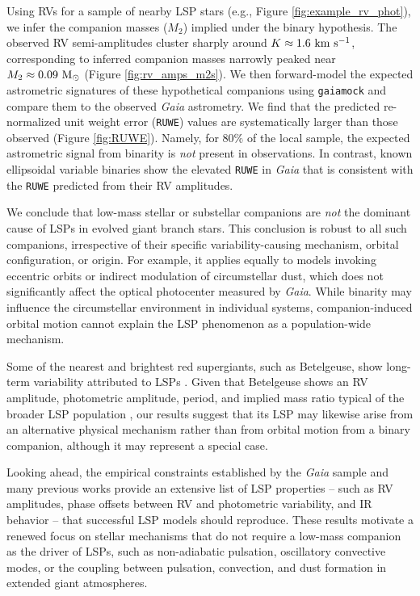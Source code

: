 \documentclass[trackchanges,twocolumn]{aastex631}
\begin{document}
Using RVs for a sample of nearby LSP stars (e.g., Figure \ref{fig:example_rv_phot}), we infer the companion masses ($M_2$) implied under the binary hypothesis. The observed RV semi-amplitudes cluster sharply around $K\approx1.6~{\rm km~s^{-1}}$, corresponding to inferred companion masses narrowly peaked near $M_2\approx0.09~{\rm M_\odot}$ (Figure \ref{fig:rv_amps_m2s}). We then forward-model the expected astrometric signatures of these hypothetical companions using {\tt gaiamock} \citep{ElBadry24} and compare them to the observed {\it Gaia} astrometry. We find that the predicted re-normalized unit weight error ({\tt RUWE}) values are systematically larger than those observed (Figure \ref{fig:RUWE}). Namely, for $80\%$ of the local sample, the expected astrometric signal from binarity is {\it not} present in observations. In contrast, known ellipsoidal variable binaries show the elevated {\tt RUWE} in {\it Gaia} that is consistent with the {\tt RUWE} predicted from their RV amplitudes. 

We conclude that low-mass stellar or substellar companions are {\it not} the dominant cause of LSPs in evolved giant branch stars. This conclusion is robust to all such companions, irrespective of their specific variability-causing mechanism, orbital configuration, or origin. For example, it applies equally to models invoking eccentric orbits or indirect modulation of circumstellar dust, which does not significantly affect the optical photocenter measured by {\it Gaia}. While binarity may influence the circumstellar environment in individual systems, companion-induced orbital motion cannot explain the LSP phenomenon as a population-wide mechanism.

Some of the nearest and brightest red supergiants, such as Betelgeuse, show long-term variability attributed to LSPs \citep[e.g.,][]{Kiss06,Joyce20,Goldberg24, MacLeod25}.
Given that Betelgeuse shows an RV amplitude, photometric amplitude, period, and implied mass ratio typical of the broader LSP population \citep[e.g.,][]{Goldberg24,MacLeod25}, our results suggest that its LSP may likewise arise from an alternative physical mechanism rather than from orbital motion from a binary companion, although it may represent a special case.

Looking ahead, the empirical constraints established by the {\it Gaia} sample and many previous works provide an extensive list of LSP properties -- such as RV amplitudes, phase offsets between RV and photometric variability, and IR behavior -- that successful LSP models should reproduce. These results motivate a renewed focus on stellar mechanisms that do not require a low-mass companion as the driver of LSPs, such as non-adiabatic pulsation, oscillatory convective modes, or the coupling between pulsation, convection, and dust formation in extended giant atmospheres. 
\end{document}
